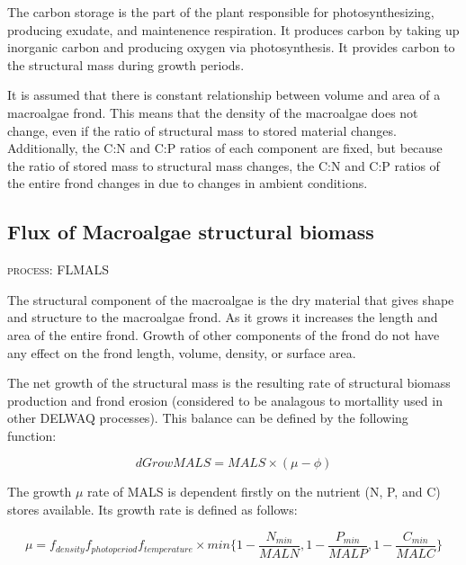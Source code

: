 \documentclass{article}
\begin{document}
The carbon storage is the part of the plant responsible for photosynthesizing, producing exudate, and maintenence respiration. It produces carbon by taking up inorganic carbon and producing oxygen via photosynthesis. It provides carbon to the structural mass during growth periods. 

It is assumed that there is constant relationship between volume and area of a macroalgae frond. This means that the density of the macroalgae does not change, even if the ratio of structural mass to stored material changes. Additionally, the C:N and C:P ratios of each component are fixed, but because the ratio of stored mass to structural mass changes, the C:N and C:P ratios of the entire frond changes in due to changes in ambient conditions.

\subsection{Flux of Macroalgae structural biomass}
\begin{flushright}
\textsc{process: FLMALS}
\end{flushright}

The structural component of the macroalgae is the dry material that gives shape and structure to the macroalgae frond. As it grows it increases the length and area of the entire frond. Growth of other components of the frond do not have any effect on the frond length, volume, density, or surface area. 

The net growth of the structural mass is the resulting rate of structural biomass production and frond erosion (considered to be analagous to mortallity used in other DELWAQ processes). This balance can be defined by the following function:

\[dGrowMALS =MALS \times (\mu - \phi)\]
 
The growth $\mu$ rate of MALS is dependent firstly on the nutrient (N, P, and C) stores available. Its growth rate is defined as follows:

\[\mu = f_{density} f_{photoperiod} f_{temperature}\times min\big\{1-\frac{N_{min}}{MALN},1-\frac{P_{min}}{MALP},1-\frac{C_{min}}{MALC}\big\}\]
\end{document}
